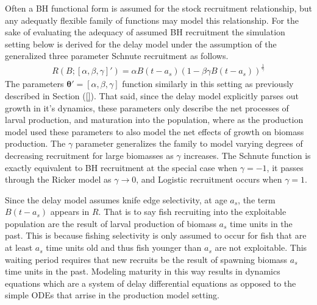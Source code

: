 %
Often a BH functional form is assumed for the stock recruitment relationship, but any adequatly 
flexible family of functions may model this relationship. For the sake of evaluating the adequacy 
of assumed BH recruitment the simulation setting below is derived for the delay model under the 
assumption of the generalized three parameter Schnute recruitment as follows.
%
\begin{align}
R(B;[\alpha, \beta, \gamma]') = \alpha B(t-a_s)(1-\beta\gamma B(t-a_s))^{\frac{1}{\gamma}} \label{srr}
\end{align}
%
The parameters $\bm{\theta}'=[\alpha, \beta, \gamma]$ %
function similarly in this setting as previously described in Section (\ref{}). 
That said, since the delay model explicitly parses out growth in it's dynamics, 
these parameters only describe the net processes of larval production, and maturation 
into the population, where as the production model used these parameters to 
also model the net effects of growth on biomass production. %
The $\gamma$ parameter generalizes the family to model varying degrees of 
decreasing recruitment for large biomasses as $\gamma$ increases. The Schnute 
function is exactly equivalent to BH recruitment at the special case when 
$\gamma=-1$, it passes through the Ricker model as $\gamma\rightarrow0$, and 
Logistic recruitment occurs when $\gamma=1$.

%
Since the delay model assumes knife edge selectivity, at age $a_s$, the term 
$B(t-a_s)$ appears in $R$. That is to say fish recruiting into the exploitable 
population are the result of larval production of biomass $a_s$ time 
units in the past. This is because fishing selectivity is only assumed to occur 
for fish that are at least $a_s$ time units old and thus fish younger than $a_s$ 
are not exploitable. This waiting period requires that new recruits be the 
result of spawning biomass $a_s$ time units in the past. Modeling maturity in 
this way results in dynamics equations which are a system of delay differential 
equations as opposed to the simple ODEs that arrise in the production model 
setting. 

